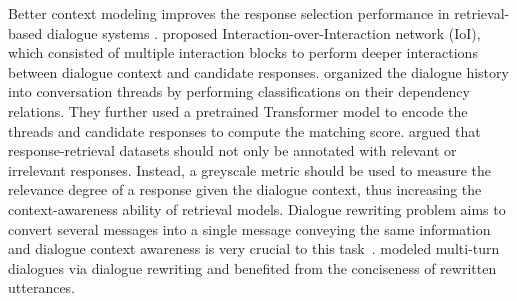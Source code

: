 Better context modeling improves the response selection performance in retrieval-based dialogue systems .  proposed Interaction-over-Interaction network (IoI), which consisted of multiple interaction blocks to perform deeper interactions between dialogue context and candidate responses.  organized the dialogue history into conversation threads by performing classifications on their dependency relations. They further used a pretrained Transformer model to encode the threads and candidate responses to compute the matching score.  argued that response-retrieval datasets should not only be annotated with relevant or irrelevant responses. Instead, a greyscale metric should be used to measure the relevance degree of a response given the dialogue context, thus increasing the context-awareness ability of retrieval models. 
Dialogue rewriting problem aims to convert several messages into a single message conveying the same information and dialogue context awareness is very crucial to this task~.  modeled multi-turn dialogues via dialogue rewriting and benefited from the conciseness of rewritten utterances.

